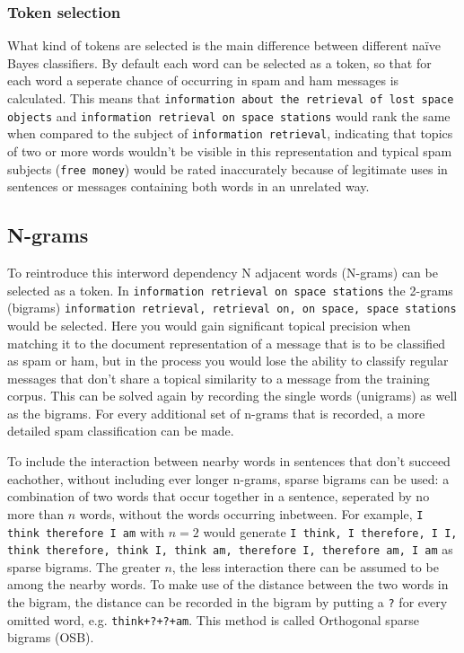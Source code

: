\documentclass[runningheads,a4paper]{llncs}
\begin{document}
\subsubsection{Token selection}
What kind of tokens are selected is the main difference between different na\"ive 
Bayes classifiers. By default each word can be selected as a token, so that for each
word a seperate chance of occurring in spam and ham messages is calculated. This
means that \texttt{information about the retrieval of lost space objects} and 
\texttt{information retrieval on space stations} would rank the same when compared 
to the subject of \texttt{information retrieval}, indicating that topics of two or 
more words wouldn't be visible in this representation and typical spam subjects 
(\texttt{free money}) would be rated inaccurately because of legitimate uses in sentences 
or messages containing both words in an unrelated way.

\subsection{N-grams}
To reintroduce this interword dependency N adjacent words (N-grams) can be selected as 
a token. In \texttt{information retrieval on space stations} the 2-grams (bigrams) 
\texttt{information retrieval, retrieval on, on space, space stations} would be 
selected. Here you would gain significant topical precision when matching it to 
the document representation of a message that is to be classified as spam or ham, 
but in the process you would lose the ability to classify regular messages that don't
share a topical similarity to a message from the training corpus. This can be solved
again by recording the single words (unigrams) as well as the bigrams. For every additional
set of n-grams that is recorded, a more detailed spam classification can be made.

To include the interaction between nearby words in sentences that don't succeed 
eachother, without including ever longer n-grams, sparse bigrams can be used: a combination 
of two words that occur together in a sentence, seperated by no more than $n$ words, 
without the words occurring inbetween. For example, \texttt{I think therefore I am} 
with $n=2$ would generate \texttt{I think, I therefore, I I, think therefore, think 
I, think am, therefore I, therefore am, I am} as sparse bigrams. The greater $n$, 
the less interaction there can be assumed to be among the nearby words. To make use 
of the distance between the two words in the bigram, the distance can be recorded 
in the bigram by putting a \texttt{?} for every omitted word, e.g. \texttt{think+?+?+am}. 
This method is called Orthogonal sparse bigrams\cite{2007systematic} (OSB).
\end{document}
